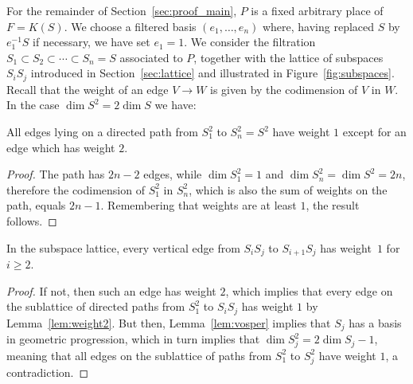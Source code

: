 \documentclass[ALCO,Unicode,ThmDefs]{cedram}
\renewcommand{\geq}{\geqslant}
\begin{document}
For the remainder of Section~\ref{sec:proof_main}, $P$ is a fixed arbitrary place of $F=K(S)$. We choose a filtered basis $(e_1, \ldots, e_n)$ where, having replaced $S$ by $e_1^{-1}S$ if necessary, we have set $e_1=1$. We consider the filtration $S_1 \subset S_2\subset \cdots \subset S_n= S$ associated to $P$, together with the lattice of subspaces $S_iS_j$ introduced in Section~\ref{sec:lattice} and illustrated in Figure~\ref{fig:subspaces}. Recall that the weight of an edge $V\rightarrow W$ is given by the codimension of $V$ in $W$. In the case $\dim S^2=2\dim S$ we have:

\begin{lemm}\label{lem:weight2}
All edges lying on a directed path from $S_1^2$ to $S_n^2= S^2$ have weight $1$ except for an edge which has weight $2$.
\end{lemm}

\begin{proof}
The path has $2n-2$ edges, while $\dim S_1^2=1$ and $\dim S_n^2=\dim S^2=2n$, therefore the codimension of $S_1^2$ in $S_n^2$, which is also the sum of weights on the path, equals $2n-1$. Remembering that weights are at least $1$, the result follows.
\end{proof}

\begin{lemm}\label{lem:vertical}
In the subspace lattice, every vertical edge from $S_iS_j$ to $S_{i+1}S_j$ has weight~$1$ for $i\geq2$.
\end{lemm}

\begin{proof}
If not, then such an edge has weight $2$, which implies that every edge on the sublattice of directed paths from $S_1^2$ to $S_iS_j$ has weight $1$ by Lemma~\ref{lem:weight2}. But then, Lemma~\ref{lem:vosper} implies that $S_j$ has a basis in geometric progression, which in turn implies that $\dim S_j^2=2\dim S_j-1$, meaning that all edges on the sublattice of paths from $S_1^2$ to $S_j^2$ have weight $1$, a contradiction.
\end{proof}
\end{document}
